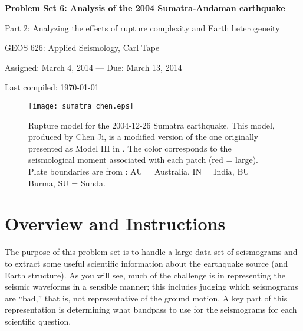 \documentclass[11pt,titlepage,fleqn]{article}
\begin{document}

\begin{center}

{\large \bf Problem Set 6: Analysis of the 2004 Sumatra-Andaman earthquake

Part 2: Analyzing the effects of rupture complexity and Earth heterogeneity

}

GEOS 626: Applied Seismology, Carl Tape

Assigned: March 4, 2014 --- Due: March 13, 2014

Last compiled: \today

\end{center}


\begin{figure}[h]
\centering
\texttt{[image: sumatra\_chen.eps]}
\caption[]
{{
Rupture model for the 2004-12-26  Sumatra earthquake.
This model, produced by Chen Ji, is a modified version of the one originally presented as Model III in \citet[][Figure~5c]{Ammon2005}.
The color corresponds to the seismological moment associated with each patch (red = large).
Plate boundaries are from \citet{Bird2003}: AU = Australia, IN = India, BU = Burma, SU = Sunda.
}}
\label{fig:sumatra_chen}
\end{figure}


\clearpage\pagebreak
\section*{Overview and Instructions}

The purpose of this problem set is to handle a large data set of seismograms and to extract some useful scientific information about the earthquake source (and Earth structure). As you will see, much of the challenge is in representing the seismic waveforms in a sensible manner; this includes judging which seismograms are ``bad,'' that is, not representative of the ground motion. A key part of this representation is determining what bandpass to use for the seismograms for each scientific question.
\end{document}
